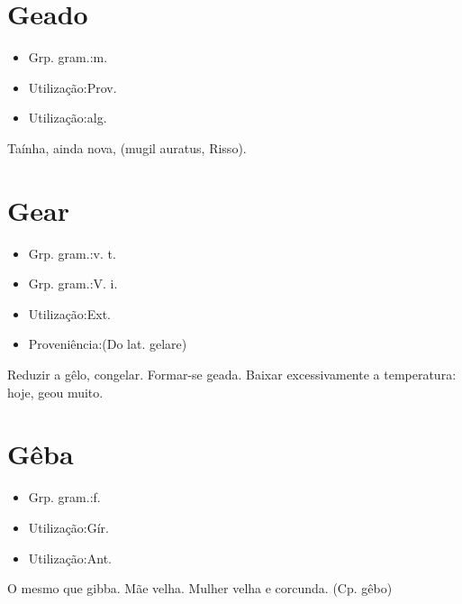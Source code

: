 \section{Geado}
\begin{itemize}
\item {Grp. gram.:m.}
\end{itemize}
\begin{itemize}
\item {Utilização:Prov.}
\end{itemize}
\begin{itemize}
\item {Utilização:alg.}
\end{itemize}
Taínha, ainda nova, (\textunderscore mugil auratus\textunderscore , Risso).
\section{Gear}
\begin{itemize}
\item {Grp. gram.:v. t.}
\end{itemize}
\begin{itemize}
\item {Grp. gram.:V. i.}
\end{itemize}
\begin{itemize}
\item {Utilização:Ext.}
\end{itemize}
\begin{itemize}
\item {Proveniência:(Do lat. \textunderscore gelare\textunderscore )}
\end{itemize}
Reduzir a gêlo, congelar.
Formar-se geada.
Baixar excessivamente a temperatura: \textunderscore hoje, geou muito\textunderscore .
\section{Gêba}
\begin{itemize}
\item {Grp. gram.:f.}
\end{itemize}
\begin{itemize}
\item {Utilização:Gír.}
\end{itemize}
\begin{itemize}
\item {Utilização:Ant.}
\end{itemize}
O mesmo que \textunderscore gibba\textunderscore .
Mãe velha.
Mulher velha e corcunda.
(Cp. \textunderscore gêbo\textunderscore )
